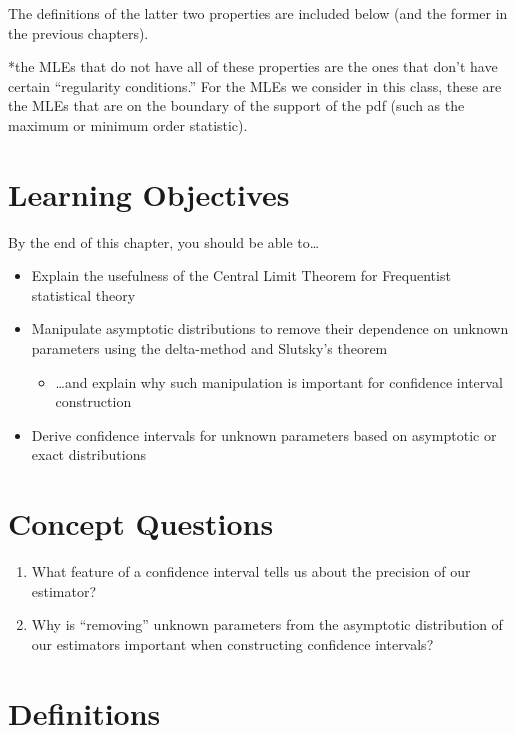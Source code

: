 \documentclass[
  letterpaper,
  DIV=11,
  numbers=noendperiod]{scrreprt}
\providecommand{\tightlist}{%
  \setlength{\itemsep}{0pt}\setlength{\parskip}{0pt}}\usepackage{longtable,booktabs,array}
\begin{document}
The definitions of the latter two properties are included below (and the
former in the previous chapters).

*the MLEs that do not have all of these properties are the ones that
don't have certain ``regularity conditions.'' For the MLEs we consider
in this class, these are the MLEs that are on the boundary of the
support of the pdf (such as the maximum or minimum order statistic).

\section{Learning Objectives}\label{learning-objectives-5}

By the end of this chapter, you should be able to\ldots{}

\begin{itemize}
\item
  Explain the usefulness of the Central Limit Theorem for Frequentist
  statistical theory
\item
  Manipulate asymptotic distributions to remove their dependence on
  unknown parameters using the delta-method and Slutsky's theorem

  \begin{itemize}
  \tightlist
  \item
    \ldots and explain why such manipulation is important for confidence
    interval construction
  \end{itemize}
\item
  Derive confidence intervals for unknown parameters based on asymptotic
  or exact distributions
\end{itemize}

\section{Concept Questions}\label{concept-questions-5}

\begin{enumerate}
\def\labelenumi{\arabic{enumi}.}
\item
  What feature of a confidence interval tells us about the precision of
  our estimator?
\item
  Why is ``removing'' unknown parameters from the asymptotic
  distribution of our estimators important when constructing confidence
  intervals?
\end{enumerate}

\section{Definitions}\label{definitions-5}
\end{document}
